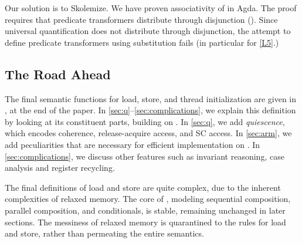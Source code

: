 \begin{example}
  Our solution is to Skolemize.  We have proven associativity of
   in Agda.  The proof requires that predicate
  transformers distribute through disjunction ().
  Since universal quantification does not distribute through disjunction, the
  attempt to define predicate transformers using substitution fails (in
  particular for \ref{L5}.)
\end{example}

\subsection{The Road Ahead}

The final semantic functions for load, store, and thread initialization are
given in , at the end of the paper.  In
\textsection\ref{sec:q}--\ref{sec:complications}, we explain this definition
by looking at its constituent parts, building on .
In \textsection\ref{sec:q}, we add \emph{quiescence}, which encodes
coherence, release-acquire access, and SC access.  In
\textsection\ref{sec:arm}, we add peculiarities that are necessary for
efficient implementation on \armeight.  In
\textsection\ref{sec:complications}, we discuss other features such as
invariant reasoning, case analysis and register recycling.

The final definitions of load and store are quite complex, due to the
inherent complexities of relaxed memory.  The core of
, modeling sequential composition, parallel
composition, and conditionals, is stable, remaining unchanged in later
sections.  The messiness of relaxed memory is quarantined to the rules
for load and store, rather than permeating the entire semantics.
